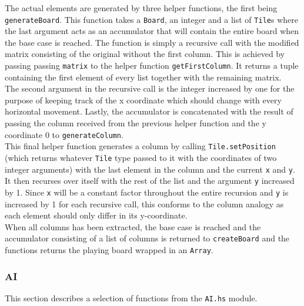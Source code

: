 \documentclass{article}
\begin{document}
 \newline
 The actual elements are generated by three helper functions, the first being \texttt{generateBoard}. This function takes a \texttt{Board}, an integer and a list of \texttt{Tile}s where the last argument acts as an accumulator that will contain the entire board when the base case is reached. The function is simply a recursive call with the modified matrix consisting of the original without the first column. This is achieved by passing passing \texttt{matrix} to the helper function \texttt{getFirstColumn}. It returns a tuple containing the first element of every list together with the remaining matrix. \\
 \newline
The second argument in the recursive call is the integer increased by one for the purpose of keeping track of the x coordinate which should change with every horizontal movement. Lastly, the accumulator is concatenated with the result of passing the column received from the previous helper function and the y coordinate 0 to \texttt{generateColumn}.\\
\newline
This final helper function generates a column by calling \texttt{Tile.setPosition} (which returns whatever \texttt{Tile} type passed to it with the coordinates of two integer arguments) with the last element in the column and the current \texttt{x} and \texttt{y}. It then recurses over itself with the rest of the list and the argument \texttt{y} increased by 1. Since \texttt{x} will be a constant factor throughout the entire recursion and \texttt{y} is increased by 1 for each recursive call, this conforms to the column analogy as each element should only differ in its y-coordinate.\\
\newline
When all columns has been extracted, the base case is reached and the accumulator consisting of a list of columns is returned to \texttt{createBoard} and the functions returns the playing board wrapped in an \texttt{Array}.

        \subsubsection{AI}
        This section describes a selection of functions from the \texttt{AI.hs} module.
\end{document}
